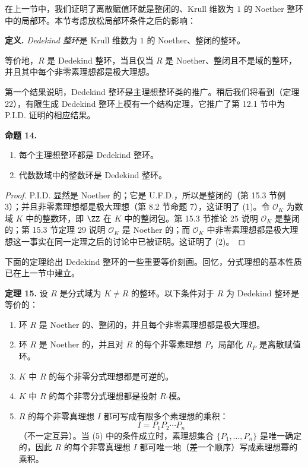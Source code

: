 在上一节中，我们证明了离散赋值环就是整闭的、Krull 维数为 $1$ 的 Noether 整环中的局部环。本节考虑放松局部环条件之后的影响：

\noindent\textbf{定义.} \emph{Dedekind 整环}是 Krull 维数为 $1$ 的 Noether、整闭的整环。

等价地，$R$ 是 Dedekind 整环，当且仅当 $R$ 是 Noether、整闭且不是域的整环，并且其中每个非零素理想都是极大理想。

第一个结果说明，Dedekind 整环是主理想整环类的推广。稍后我们将看到（定理 22），有限生成 Dedekind 整环上模有一个结构定理，它推广了第 12.1 节中为 P.I.D. 证明的相应结果。

\medskip
\noindent\textbf{命题 14.}
\begin{enumerate}[label=(\arabic*)]
  \item 每个主理想整环都是 Dedekind 整环。
  \item 代数数域中的整数环是 Dedekind 整环。
\end{enumerate}

\begin{proof}
P.I.D. 显然是 Noether 的；它是 U.F.D.，所以是整闭的（第 15.3 节例 3）；并且非零素理想都是极大理想（第 8.2 节命题 7），这证明了 (1)。令 $\mathcal O_K$ 为数域 $K$ 中的整数环，即 $\ZZ$ 在 $K$ 中的整闭包。第 15.3 节推论 25 说明 $\mathcal O_K$ 是整闭的；第 15.3 节定理 29 说明 $\mathcal O_K$ 是 Noether 的；而 $\mathcal O_K$ 中非零素理想都是极大理想这一事实在同一定理之后的讨论中已被证明。这证明了 (2)。
\end{proof}

下面的定理给出 Dedekind 整环的一些重要等价刻画。回忆，分式理想的基本性质已在上一节中建立。

\medskip
\noindent\textbf{定理 15.} 设 $R$ 是分式域为 $K\neq R$ 的整环。以下条件对于 $R$ 为 Dedekind 整环是等价的：
\begin{enumerate}[label=(\arabic*)]
  \item 环 $R$ 是 Noether 的、整闭的，并且每个非零素理想都是极大理想。
  \item 环 $R$ 是 Noether 的，并且对 $R$ 的每个非零素理想 $P$，局部化 $R_P$ 是离散赋值环。
  \item $K$ 中 $R$ 的每个非零分式理想都是可逆的。
  \item $K$ 中 $R$ 的每个非零分式理想都是投射 $R$-模。
  \item $R$ 的每个非零真理想 $I$ 都可写成有限多个素理想的乘积：
  \[
    I=P_1P_2\cdots P_n
  \]
  （不一定互异）。当 (5) 中的条件成立时，素理想集合 $\{P_1,
  \ldots,P_n\}$ 是唯一确定的，因此 $R$ 的每个非零真理想 $I$ 都可唯一地（差一个顺序）写成素理想幂的乘积。
\end{enumerate}

